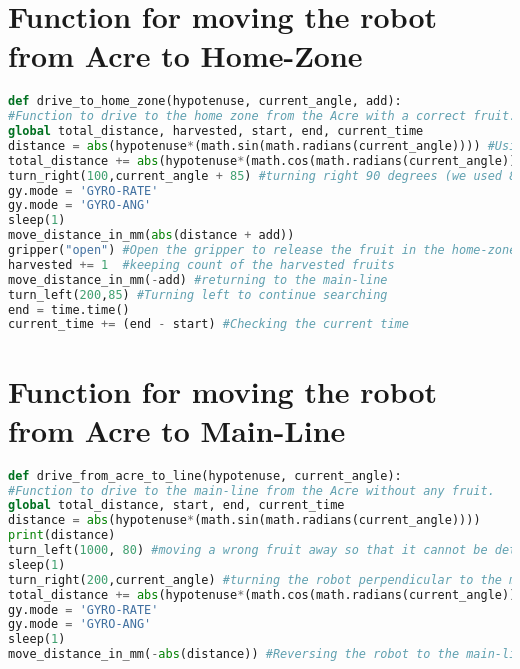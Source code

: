 \section{Function for moving the robot from Acre to Home-Zone}
\vspace{-7mm}
\begin{lstlisting}[language={python}, caption={Function for moving the robot from Acre to Home-Zone}, label=driveToHomeZone]
def drive_to_home_zone(hypotenuse, current_angle, add):
#Function to drive to the home zone from the Acre with a correct fruit.
global total_distance, harvested, start, end, current_time
distance = abs(hypotenuse*(math.sin(math.radians(current_angle)))) #Using Pythagorean theorem to calculate the distance from the fruit to the home-zone
total_distance += abs(hypotenuse*(math.cos(math.radians(current_angle)))) #Adding the distance moved forward to the total for returning to the starting point
turn_right(100,current_angle + 85) #turning right 90 degrees (we used 85 because the Gyro-sensor was not accurate)
gy.mode = 'GYRO-RATE'
gy.mode = 'GYRO-ANG'
sleep(1)
move_distance_in_mm(abs(distance + add)) 
gripper("open") #Open the gripper to release the fruit in the home-zone
harvested += 1  #keeping count of the harvested fruits
move_distance_in_mm(-add) #returning to the main-line
turn_left(200,85) #Turning left to continue searching
end = time.time()
current_time += (end - start) #Checking the current time
\end{lstlisting}

\section{Function for moving the robot from Acre to Main-Line}
\vspace{-7mm}
\begin{lstlisting}[language={python}, caption={Function for moving the robot from Acre to Main-Line}, label=driveFromAcreToLine]
def drive_from_acre_to_line(hypotenuse, current_angle):
#Function to drive to the main-line from the Acre without any fruit.
global total_distance, start, end, current_time
distance = abs(hypotenuse*(math.sin(math.radians(current_angle))))
print(distance)
turn_left(1000, 80) #moving a wrong fruit away so that it cannot be detected again.
sleep(1)
turn_right(200,current_angle) #turning the robot perpendicular to the main line after moving a wrong fruit.
total_distance += abs(hypotenuse*(math.cos(math.radians(current_angle)))) #Adding the distance moved forward to the total for returning to the starting point
gy.mode = 'GYRO-RATE'
gy.mode = 'GYRO-ANG'
sleep(1)
move_distance_in_mm(-abs(distance)) #Reversing the robot to the main-line
\end{lstlisting}

